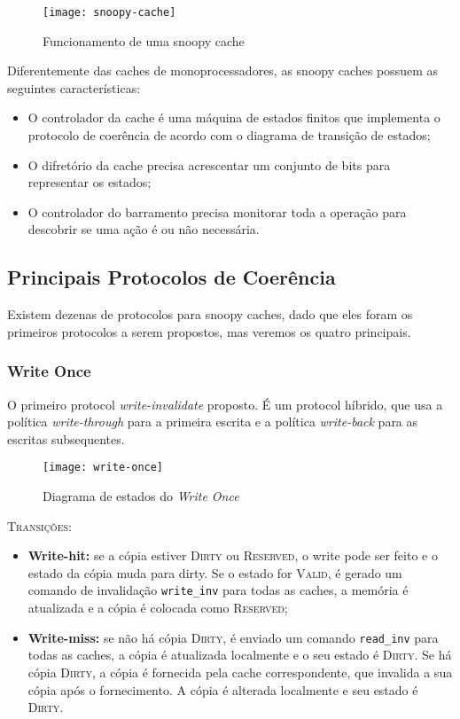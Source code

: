 \begin{figure}
  \centering
  \texttt{[image: snoopy-cache]}
  \label{fig:snoopy-cache}
  \caption{Funcionamento de uma snoopy cache}
\end{figure}

Diferentemente das caches de monoprocessadores, as snoopy caches possuem as seguintes características:
\begin{itemize}
  \item O controlador da cache é uma máquina de estados finitos que implementa o protocolo de coerência de acordo com o diagrama de transição de estados;

  \item O difretório da cache precisa acrescentar um conjunto de bits para representar os estados;

  \item O controlador do barramento precisa monitorar toda a operação para descobrir se uma ação é ou não necessária.
\end{itemize}




\subsection{Principais Protocolos de Coerência}
Existem dezenas de protocolos para snoopy caches, dado que eles foram os primeiros protocolos a serem propostos, mas veremos os quatro principais.


\subsubsection{Write Once}
O primeiro protocol \textit{write-invalidate} proposto. É um protocol híbrido, que usa a política \textit{write-through} para a primeira escrita e a política \textit{write-back} para as escritas subsequentes.

\begin{figure}[ht]
  \centering
  \texttt{[image: write-once]}
  \label{fig:writeonce-automata}
  \caption{Diagrama de estados do \textit{Write Once}}
\end{figure}

\textsc{Transições:}
\begin{itemize}
  \item \textbf{Write-hit:} se a cópia estiver \textsc{Dirty} ou \textsc{Reserved}, o write pode ser feito e o estado da cópia muda para dirty. Se o estado for \textsc{Valid}, é gerado um comando de invalidação \texttt{write\_inv} para todas as caches, a memória é atualizada e a cópia é colocada como \textsc{Reserved};

  \item \textbf{Write-miss:} se não há cópia \textsc{Dirty}, é enviado um comando \texttt{read\_inv} para todas as caches, a cópia é atualizada localmente e o seu estado é \textsc{Dirty}. Se há cópia \textsc{Dirty}, a cópia é fornecida pela cache correspondente, que invalida a sua cópia após o fornecimento. A cópia é alterada localmente e seu estado é \textsc{Dirty}.
\end{itemize}




